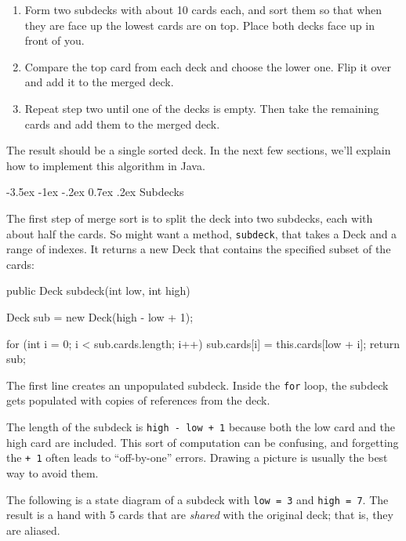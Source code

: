 \documentclass[12pt]{book}
\makeatletter
\theoremstyle{exercise}
\newcommand{\java}[1]{\verb"#1"}
\renewcommand{\section}{\@startsection{section}{1}{\z@}%
    {-3.5ex \@plus -1ex \@minus -.2ex}%
    {0.7ex \@plus.2ex}%
    {\normalfont\Large\bfseries}}
\newcommand{\java}[1]{\lstinline{#1}} %
\makeatother
\begin{document}
\begin{enumerate}

\item Form two subdecks with about 10 cards each, and sort them so that when they are face up the lowest cards are on top.
Place both decks face up in front of you.

\item Compare the top card from each deck and choose the lower one.
Flip it over and add it to the merged deck.

\item Repeat step two until one of the decks is empty.
Then take the remaining cards and add them to the merged deck.

\end{enumerate}

The result should be a single sorted deck.
In the next few sections, we'll explain how to implement this algorithm in Java.


\section{Subdecks}

The first step of merge sort is to split the deck into two subdecks, each with about half the cards.
So might want a method, \java{subdeck}, that takes a Deck and a range of indexes.
It returns a new Deck that contains the specified subset of the cards:

\begin{code}
public Deck subdeck(int low, int high) {
    Deck sub = new Deck(high - low + 1);

    for (int i = 0; i < sub.cards.length; i++) {
        sub.cards[i] = this.cards[low + i];
    }
    return sub;
}
\end{code}

The first line creates an unpopulated subdeck.
Inside the \java{for} loop, the subdeck gets populated with copies of references from the deck.

The length of the subdeck is \java{high - low + 1} because both the low card and the high card are included.
This sort of computation can be confusing, and forgetting the \java{+ 1} often leads to ``off-by-one'' errors.
Drawing a picture is usually the best way to avoid them.


The following is a state diagram of a subdeck with \java{low = 3} and \java{high = 7}.
The result is a hand with 5 cards that are {\em shared} with the original deck; that is, they are aliased.
\end{document}
